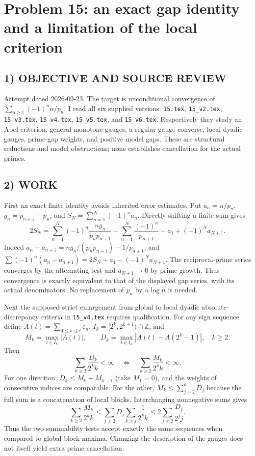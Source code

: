 \section{Problem 15: an exact gap identity and a limitation of the local criterion}
\subsection*{1) OBJECTIVE AND SOURCE REVIEW}
Attempt dated 2026-09-23. The target is unconditional convergence of $\sum_{n\ge1}(-1)^nn/p_n$. I read all six supplied versions: \texttt{15.tex}, \texttt{15\_v2.tex}, \texttt{15\_v3.tex}, \texttt{15\_v4.tex}, \texttt{15\_v5.tex}, and \texttt{15\_v6.tex}. Respectively they study an Abel criterion, general monotone gauges, a regular-gauge converse, local dyadic gauges, prime-gap weights, and positive model gaps. These are structural reductions and model obstructions; none establishes cancellation for the actual primes.
\subsection*{2) WORK}
First an exact finite identity avoids inherited error estimates. Put $a_n=n/p_n$, $g_n=p_{n+1}-p_n$, and $S_N=\sum_{n=1}^N(-1)^na_n$. Directly shifting a finite sum gives
\[
2S_N=\sum_{n=1}^N(-1)^n\frac{ng_n}{p_np_{n+1}}
-\sum_{n=1}^N\frac{(-1)^n}{p_{n+1}}-a_1+(-1)^Na_{N+1}.
\]
Indeed $a_n-a_{n+1}=ng_n/(p_np_{n+1})-1/p_{n+1}$, and $\sum(-1)^n(a_n-a_{n+1})=2S_N+a_1-(-1)^Na_{N+1}$. The reciprocal-prime series converges by the alternating test and $a_{N+1}\to0$ by prime growth. Thus convergence is exactly equivalent to that of the displayed gap series, with its actual denominators. No replacement of $p_n$ by $n\log n$ is needed.

Next the supposed strict enlargement from global to local dyadic absolute-discrepancy criteria in \texttt{15\_v4.tex} requires qualification. For any sign sequence define $A(t)=\sum_{4\le n\le t}\varepsilon_n$, $I_k=[2^k,2^{k+1})\cap\mathbb Z$, and
\[
M_k=\max_{t\in I_k}|A(t)|,\qquad D_k=\max_{t\in I_k}|A(t)-A(2^k-1)|,\quad k\ge2.
\]
Then
\[
\sum_{k\ge2}\frac{D_k}{2^kk}<\infty
\quad\Longleftrightarrow\quad
\sum_{k\ge2}\frac{M_k}{2^kk}<\infty.
\]
For one direction, $D_k\le M_k+M_{k-1}$ (take $M_1=0$), and the weights of consecutive indices are comparable. For the other, $M_k\le\sum_{j=2}^kD_j$ because the full sum is a concatenation of local blocks. Interchanging nonnegative sums gives
\[
\sum_{k\ge2}\frac{M_k}{2^kk}
\le\sum_{j\ge2}D_j\sum_{k\ge j}\frac1{2^kk}
\le2\sum_{j\ge2}\frac{D_j}{2^jj}.
\]
Thus the two summability tests accept exactly the same sequences when compared to global block maxima. Changing the description of the gauges does not itself yield extra prime cancellation.
